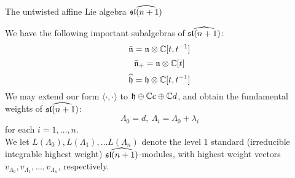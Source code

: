 \documentclass{beamer}
\begin{document}
\begin{frame}{The untwisted affine Lie algebra $\widehat{\frak{sl}(n+1)}$}


We have the following important subalgebras of $\widehat{\frak{sl}(n+1)}$:
$$\bar{\frak{n}} = \frak{n}\otimes\mathbb{C}[t,t^{-1}]$$
$$\bar{\frak{n}}_+ = \frak{n} \otimes \mathbb{C}[t]$$
$$\widehat{\frak{h}} = \frak{h} \otimes \mathbb{C}[t,t^{-1}]$$
\pause
We may extend our form $\langle \cdot, \cdot \rangle$ to $\frak{h} \oplus \mathbb{C}c \oplus \mathbb{C}d$, and obtain the fundamental weights of $\widehat{\frak{sl}(n+1)}$:
$$\Lambda_0 = d,\  \Lambda_i = \Lambda_0 + \lambda_i$$
for each $i=1,\dots,n$.\\
\vspace{0.1in}
\pause
We let $L(\Lambda_0), L(\Lambda_1),\dots L(\Lambda_n)$ denote the level $1$ standard (irreducible integrable highest weight) $\widehat{\frak{sl}(n+1)}$-modules, with highest weight vectors $v_{\Lambda_0}, v_{\Lambda_1},\dots, v_{\Lambda_n}$, respectively.\\

\end{frame}
\end{document}
